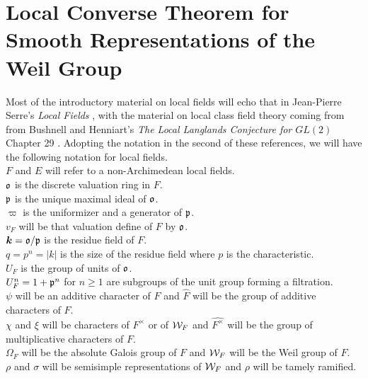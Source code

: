 \chapter{Local Converse Theorem for Smooth Representations of the Weil Group}	%

Most of the introductory material on local fields will echo that in Jean-Pierre Serre's \textit{Local Fields} \cite{Serre1979}, with the material on local class field theory coming from from Bushnell and Henniart's \textit{The Local Langlands Conjecture for $GL(2)$} Chapter 29 \cite{Bushnell2006}.
Adopting the notation in the second of these references, we will have the following notation for local fields.\\
$F$ and $E$ will refer to a non-Archimedean local fields.\\
$\mathfrak{o}$ is the discrete valuation ring in $F$.\\
$\mathfrak{p}$ is the unique maximal ideal of $\mathfrak{o}$.\\
$\varpi$ is the uniformizer and a generator of $\mathfrak{p}$.\\
$v_F$ will be that valuation define of $F$ by $\mathfrak{o}$.\\
$\bm{k} = \mathfrak{o}/\mathfrak{p}$ is the residue field of $F$.\\
$q = p^n = |k|$ is the size of the residue field where $p$ is the characteristic.\\
$U_F$ is the group of units of $\mathfrak{o}$.\\
$U_F^n = 1 + \mathfrak{p}^n$ for $n \geq 1$ are subgroups of the unit group forming a filtration.\\
$\psi$ will be an additive character of $F$ and $\widehat{F}$ will be the group of additive characters of $F$. \\
$\chi$ and $\xi$ will be characters of $F^\times$ or of $\mathcal{W}_F$ and $\widehat{F^\times}$ will be the group of multiplicative characters of $F$. \\
$\Omega_F$ will be the absolute Galois group of $F$ and $\mathcal{W}_F$ will be the Weil group of $F$. \\
$\rho$ and $\sigma$ will be semisimple representations of $\mathcal{W}_F$ and $\rho$ will be tamely ramified.\\


